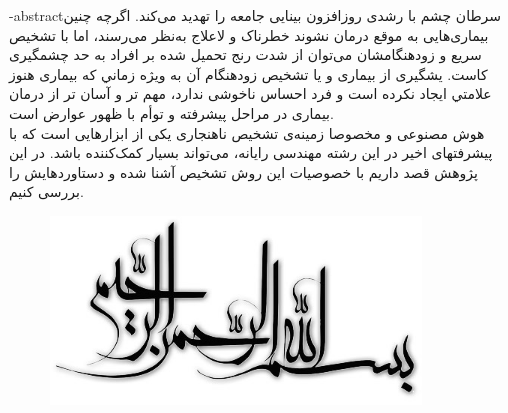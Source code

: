 \secondsupervisor{}

\fa-abstract{سرطان چشم با رشدی روزافزون بینایی جامعه را تهدید می‌کند. اگرچه چنین بیماری‌هایی به موقع درمان نشوند خطرناک و لاعلاج به‌نظر می‌رسند، اما با تشخیص سریع و زودهنگامشان می‌توان از شدت رنج تحمیل شده بر افراد به حد چشمگیری کاست. یشگیری از بیماری و یا تشخیص زودهنگام آن به ویژه زماني که بیماری هنوز علامتي ایجاد نکرده است و فرد احساس ناخوشی ندارد، مهم تر و آسان تر از درمان بیماری در مراحل پیشرفته و توأم با ظهور عوارض است.
\\
هوش مصنوعی و مخصوصا زمینه‌ی تشخیص ناهنجاری یکی از ابزارهایی است که با پیشرفتهای اخیر در این رشته مهندسی رایانه، می‌تواند بسیار کمک‌کننده باشد. در این پژوهش قصد داریم با خصوصیات این روش تشخیص آشنا شده و دستاوردهایش را بررسی کنیم.
}





\AUTtitle
\vspace*{7cm}
\thispagestyle{empty}
\begin{center}
\includegraphics[height=5cm,width=12cm]{besm}
\end{center}